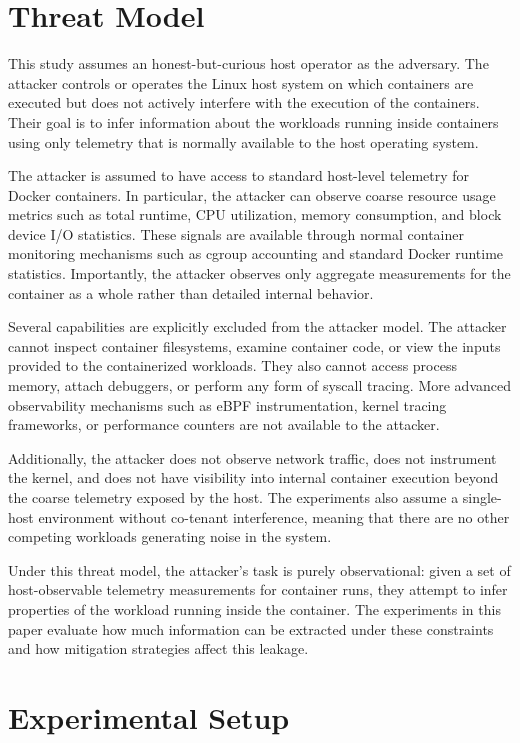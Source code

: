 \documentclass[11pt]{article}
\begin{document}
\section{Threat Model}

This study assumes an honest-but-curious host operator as the adversary. The attacker controls or operates the Linux host system on which containers are executed but does not actively interfere with the execution of the containers. Their goal is to infer information about the workloads running inside containers using only telemetry that is normally available to the host operating system.

The attacker is assumed to have access to standard host-level telemetry for Docker containers. In particular, the attacker can observe coarse resource usage metrics such as total runtime, CPU utilization, memory consumption, and block device I/O statistics. These signals are available through normal container monitoring mechanisms such as cgroup accounting and standard Docker runtime statistics. Importantly, the attacker observes only aggregate measurements for the container as a whole rather than detailed internal behavior.

Several capabilities are explicitly excluded from the attacker model. The attacker cannot inspect container filesystems, examine container code, or view the inputs provided to the containerized workloads. They also cannot access process memory, attach debuggers, or perform any form of syscall tracing. More advanced observability mechanisms such as eBPF instrumentation, kernel tracing frameworks, or performance counters are not available to the attacker.

Additionally, the attacker does not observe network traffic, does not instrument the kernel, and does not have visibility into internal container execution beyond the coarse telemetry exposed by the host. The experiments also assume a single-host environment without co-tenant interference, meaning that there are no other competing workloads generating noise in the system.

Under this threat model, the attacker’s task is purely observational: given a set of host-observable telemetry measurements for container runs, they attempt to infer properties of the workload running inside the container. The experiments in this paper evaluate how much information can be extracted under these constraints and how mitigation strategies affect this leakage.

\section{Experimental Setup}
\end{document}
